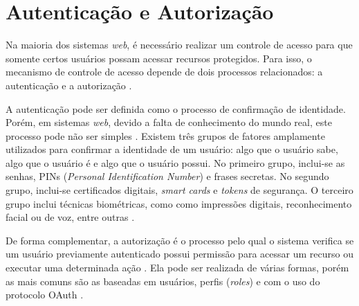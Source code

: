 \section{Autenticação e Autorização}

Na maioria dos sistemas \emph{web}, é necessário realizar um controle de acesso para que somente
certos usuários possam acessar recursos protegidos. Para isso, o mecanismo  de controle de
acesso depende de dois processos relacionados: a autenticação e a autorização
\cite{SULLIVAN2011}.

A autenticação pode ser definida como o processo de confirmação de identidade. Porém, em sistemas 
\emph{web}, devido a falta de conhecimento do mundo real, este processo pode não ser simples
\cite{CHAPMAN2012}. Existem três grupos de fatores amplamente utilizados para confirmar a
identidade de um usuário: algo que o usuário sabe, algo que o usuário é e algo que o usuário
possui. No primeiro grupo, inclui-se as senhas, PINs (\emph{Personal Identification Number}) e
frases secretas. No segundo grupo, inclui-se certificados digitais, \emph{smart cards} e
\emph{tokens} de segurança. O terceiro grupo inclui técnicas biométricas, como como impressões
digitais, reconhecimento facial ou de voz, entre outras \cite{SULLIVAN2011}.

De forma complementar, a autorização é o processo pelo qual o sistema verifica se um usuário 
previamente autenticado possui permissão para acessar um recurso ou executar uma determinada ação 
\cite{SPILCA2020}. Ela pode ser realizada de várias formas, porém as mais comuns são as baseadas em 
usuários, perfis (\emph{roles}) e com o uso do protocolo OAuth \cite{CHAPMAN2012}.